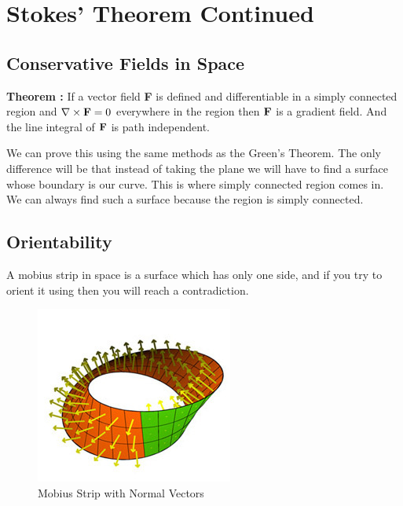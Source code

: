 

\chapter{Stokes' Theorem Continued} 

\bigbreak

\section{Conservative Fields in Space}

{\bf Theorem : } If a vector field {\bf F} is defined and differentiable in a simply connected region
and $\nabla \times {\bf F} = 0$ everywhere in the region then ${\bf F}$ is a gradient field.
And the line integral of ${\bf F}$ is path independent.

We can prove this using the same methods as the Green's Theorem.
The only difference will be that instead of taking the plane we will have to find a surface whose boundary is our curve.
This is where  simply connected region comes in. 
We can always find such a surface because the region is simply connected.


\section{Orientability}

A mobius strip in space is a surface which has only one side,
and if you try to orient it using then you will reach a contradiction.

\begin{figure}[ht!]
    \centering
    \includegraphics[scale=0.5]{./images/lecture_28_figure_1.png}
    \caption{Mobius Strip with Normal Vectors}
\end{figure}

